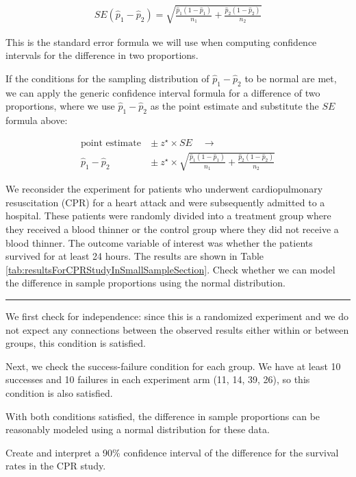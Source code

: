 \documentclass[
  10pt,
  openany]{book}
\theoremstyle{definition}
\theoremstyle{definition}
\theoremstyle{definition}
\theoremstyle{definition}
\theoremstyle{remark}
\begin{document}
\begin{eqnarray*}
  SE(\hat{p}_1 -\hat{p}_2) = \sqrt{\frac{\hat{p}_1(1-\hat{p}_1)}{n_1} + \frac{\hat{p}_2(1-\hat{p}_2)}{n_2}}
  \end{eqnarray*}

This is the standard error formula we will use when computing confidence intervals for the difference in two proportions.

If the conditions for the sampling distribution of \(\hat{p}_1 - \hat{p}_2\) to be normal are met, we can apply the generic confidence interval formula for a difference of two proportions, where we use \(\hat{p}_1 - \hat{p}_2\) as the point estimate and substitute the \(SE\) formula above:

\begin{align*}
\text{point estimate} \ &\pm\  z^{\star} \times SE  \quad\to\\
\hat{p}_1 - \hat{p}_2 \ &\pm\ z^{\star} \times \sqrt{\frac{\hat{p}_1(1-\hat{p}_1)}{n_1}+\frac{\hat{p}_2(1-\hat{p}_2)}{n_2}}
\end{align*}

We reconsider the experiment for patients who underwent cardiopulmonary resuscitation (CPR) for a heart attack and were subsequently admitted to a hospital. These patients were randomly divided into a treatment group where they received a blood thinner or the control group where they did not receive a blood thinner. The outcome variable of interest was whether the patients survived for at least 24 hours. The results are shown in Table \ref{tab:resultsForCPRStudyInSmallSampleSection}. Check whether we can model the difference in sample proportions using the normal distribution.

\begin{center}\rule{0.5\linewidth}{0.5pt}\end{center}

We first check for independence: since this is a randomized experiment and we do not expect any connections between the observed results either within or between groups, this condition is satisfied.

Next, we check the success-failure condition for each group. We have at least 10 successes and 10 failures in each experiment arm (11, 14, 39, 26), so this condition is also satisfied.

With both conditions satisfied, the difference in sample proportions can be reasonably modeled using a normal distribution for these data.

Create and interpret a 90\% confidence interval of the difference for the survival rates in the CPR study.
\end{document}
